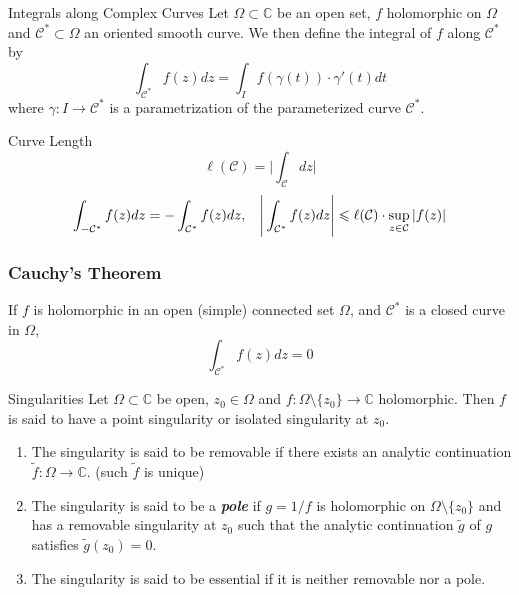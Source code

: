 \documentclass{beamer}
\begin{document}
\begin{frame}
\begin{block}{Integrals along Complex Curves}
Let $\Omega\subset\mathbb{C}$ be an open set, $f$ holomorphic on $\Omega$ and $\mathcal{C}^*\subset\Omega$ an oriented smooth curve. We then define the integral of $f$ along $\mathcal{C}^* $ by 
$$\int_{\mathcal{C}^*}f(z)dz=\int_If(\gamma(t))\cdot\gamma'(t)dt$$
where $\gamma:I\rightarrow \mathcal{C}^* $ is a parametrization of the parameterized curve $\mathcal{C}^*$.
\end{block}
\begin{block}{Curve Length}
$$\ell(\mathcal{C})=\Bigg|\int_{\mathcal{C}}dz\Bigg|$$
$$\int_{-\mathcal{C}^*}f(z)dz=-\int_{\mathcal{C}^*}f(z)dz,\hspace{3mm}\Bigg|\int_{\mathcal{C}^*}f(z)dz\Bigg|\leqslant\ell(\mathcal{C})\cdot\sup_{z\in\mathcal{C}}|f(z)|$$
\end{block}
\end{frame}


\begin{frame}
\frametitle{Cauchy's Theorem}

If $f$ is holomorphic in an open (simple) connected set $\Omega$, and $\mathcal{C}^*$ is a closed curve in $\Omega$,
$$\int_{\mathcal{C}^*}f(z)dz=0$$
\end{frame}

\begin{frame}
\begin{block}{Singularities}
Let $\Omega\subset\mathbb{C}$ be open, $z_0\in\Omega$ and $f:\Omega\setminus\lbrace z_0\rbrace\rightarrow\mathbb{C}$ holomorphic. Then $f$ is said to have a point singularity or isolated singularity at $z_0$.
\begin{enumerate}
\item The singularity is said to be removable if there exists an analytic continuation $\tilde{f}:\Omega\rightarrow\mathbb{C}$. (such $\tilde{f} $ is unique)
\item The singularity is said to be a \textcolor[rgb]{0,0.6,0.3}{\textit{\textbf{pole}}} if $g=1/f$ is holomorphic on $\Omega\setminus\lbrace z_0\rbrace$ and has a removable singularity at $z_0$ such that the analytic continuation $\tilde{g}$ of $g$ satisfies $\tilde{g}(z_0)=0$.
\item The singularity is said to be essential if it is neither removable nor a pole.
\end{enumerate}
\end{block}
\end{frame}
\end{document}
